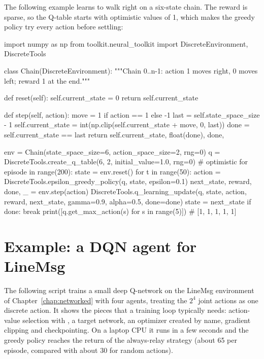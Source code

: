 The following example learns to walk right on a six-state chain. The reward
is sparse, so the Q-table starts with optimistic values of 1, which makes the
greedy policy try every action before settling:

\begin{pycode}
import numpy as np
from toolkit.neural_toolkit import DiscreteEnvironment, DiscreteTools

class Chain(DiscreteEnvironment):
    """Chain 0..n-1: action 1 moves right, 0 moves left; reward 1 at the end."""

    def reset(self):
        self.current_state = 0
        return self.current_state

    def step(self, action):
        move = 1 if action == 1 else -1
        last = self.state_space_size - 1
        self.current_state = int(np.clip(self.current_state + move, 0, last))
        done = self.current_state == last
        return self.current_state, float(done), done, {}

env = Chain(state_space_size=6, action_space_size=2, rng=0)
q = DiscreteTools.create_q_table(6, 2, initial_value=1.0, rng=0)   # optimistic
for episode in range(200):
    state = env.reset()
    for t in range(50):
        action = DiscreteTools.epsilon_greedy_policy(q, state, epsilon=0.1)
        next_state, reward, done, _ = env.step(action)
        DiscreteTools.q_learning_update(q, state, action, reward, next_state,
                                        gamma=0.9, alpha=0.5, done=done)
        state = next_state
        if done:
            break
print([q.get_max_action(s) for s in range(5)])    # [1, 1, 1, 1, 1]
\end{pycode}

\section{Example: a DQN agent for LineMsg}\label{sec:neural-example}

The following script trains a small deep Q-network on the LineMsg environment
of Chapter~\ref{chap:networked} with four agents, treating the $2^4$ joint
actions as one discrete action. It shows the pieces that a training loop
typically needs: action-value selection with , a target
network, an optimizer created by name, gradient clipping and checkpointing.
On a laptop CPU it runs in a few seconds and the greedy policy reaches the
return of the always-relay strategy (about 65 per episode, compared with
about 30 for random actions).

